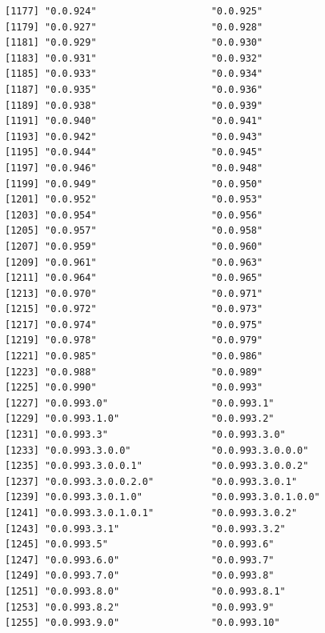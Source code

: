 \documentclass[
  letterpaper,
  DIV=11,
  numbers=noendperiod]{scrreprt}
\begin{document}
\begin{verbatim}
[1177] "0.0.924"                    "0.0.925"                   
[1179] "0.0.927"                    "0.0.928"                   
[1181] "0.0.929"                    "0.0.930"                   
[1183] "0.0.931"                    "0.0.932"                   
[1185] "0.0.933"                    "0.0.934"                   
[1187] "0.0.935"                    "0.0.936"                   
[1189] "0.0.938"                    "0.0.939"                   
[1191] "0.0.940"                    "0.0.941"                   
[1193] "0.0.942"                    "0.0.943"                   
[1195] "0.0.944"                    "0.0.945"                   
[1197] "0.0.946"                    "0.0.948"                   
[1199] "0.0.949"                    "0.0.950"                   
[1201] "0.0.952"                    "0.0.953"                   
[1203] "0.0.954"                    "0.0.956"                   
[1205] "0.0.957"                    "0.0.958"                   
[1207] "0.0.959"                    "0.0.960"                   
[1209] "0.0.961"                    "0.0.963"                   
[1211] "0.0.964"                    "0.0.965"                   
[1213] "0.0.970"                    "0.0.971"                   
[1215] "0.0.972"                    "0.0.973"                   
[1217] "0.0.974"                    "0.0.975"                   
[1219] "0.0.978"                    "0.0.979"                   
[1221] "0.0.985"                    "0.0.986"                   
[1223] "0.0.988"                    "0.0.989"                   
[1225] "0.0.990"                    "0.0.993"                   
[1227] "0.0.993.0"                  "0.0.993.1"                 
[1229] "0.0.993.1.0"                "0.0.993.2"                 
[1231] "0.0.993.3"                  "0.0.993.3.0"               
[1233] "0.0.993.3.0.0"              "0.0.993.3.0.0.0"           
[1235] "0.0.993.3.0.0.1"            "0.0.993.3.0.0.2"           
[1237] "0.0.993.3.0.0.2.0"          "0.0.993.3.0.1"             
[1239] "0.0.993.3.0.1.0"            "0.0.993.3.0.1.0.0"         
[1241] "0.0.993.3.0.1.0.1"          "0.0.993.3.0.2"             
[1243] "0.0.993.3.1"                "0.0.993.3.2"               
[1245] "0.0.993.5"                  "0.0.993.6"                 
[1247] "0.0.993.6.0"                "0.0.993.7"                 
[1249] "0.0.993.7.0"                "0.0.993.8"                 
[1251] "0.0.993.8.0"                "0.0.993.8.1"               
[1253] "0.0.993.8.2"                "0.0.993.9"                 
[1255] "0.0.993.9.0"                "0.0.993.10"                

\end{verbatim}
\end{document}
